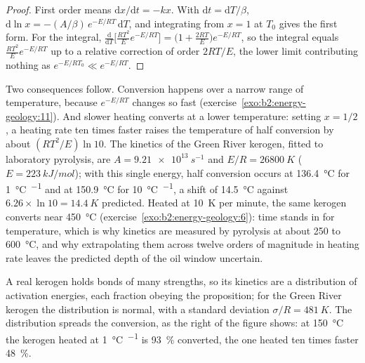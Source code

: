 \begin{proof}
First order means $\mathrm{d}x/\mathrm{d}t = -k x$. With $\mathrm{d}t = \mathrm{d}T/\beta$,
$\mathrm{d}\ln x = -(A/\beta)\,e^{-E/RT}\,\mathrm{d}T$, and integrating from $x = 1$ at $T_0$ gives
the first form. For the integral, $\frac{\mathrm{d}}{\mathrm{d}T}\bigl[\frac{RT^2}{E}e^{-E/RT}\bigr]
= \bigl(1 + \frac{2RT}{E}\bigr)e^{-E/RT}$, so the integral equals $\frac{RT^2}{E}e^{-E/RT}$ up to a
relative correction of order $2RT/E$, the lower limit contributing nothing as $e^{-E/RT_0} \ll
e^{-E/RT}$.
\end{proof}

Two consequences follow. Conversion happens over a narrow range of temperature, because
$e^{-E/RT}$ changes so fast (exercise~\ref{exo:b2:energy-geology:11}). And slower heating converts
at a lower temperature: setting $x = 1/2$, a heating rate ten times faster raises the temperature of
half conversion by about $(RT^2/E)\ln 10$. The kinetics of the Green River kerogen, fitted to
laboratory pyrolysis, are $A = \qty{9.21e13}{s^{-1}}$ and $E/R = \qty{26800}{K}$ ($E =
\qty{223}{kJ/mol}$); with this single energy, half conversion occurs at \qty{136.4}{\celsius} for
\qty{1}{\celsius\per\Myr} and at \qty{150.9}{\celsius} for \qty{10}{\celsius\per\Myr}, a shift of
\qty{14.5}{\celsius} against $6.26 \times \ln 10 = \qty{14.4}{K}$ predicted. Heated at
\qty{10}{K} per minute, the same kerogen converts near \qty{450}{\celsius}
(exercise~\ref{exo:b2:energy-geology:6}): time stands in for temperature, which is why kinetics are
measured by pyrolysis at about 250 to \qty{600}{\celsius}, and why extrapolating them across twelve
orders of magnitude in heating rate leaves the predicted depth of the oil window uncertain.

A real kerogen holds bonds of many strengths, so its kinetics are a distribution of activation
energies, each fraction obeying the proposition; for the Green River kerogen the distribution is
normal, with a standard deviation $\sigma/R = \qty{481}{K}$. The distribution spreads the
conversion, as the right of the figure shows: at \qty{150}{\celsius} the kerogen heated at
\qty{1}{\celsius\per\Myr} is \qty{93}{\percent} converted, the one heated ten times faster
\qty{48}{\percent}.


